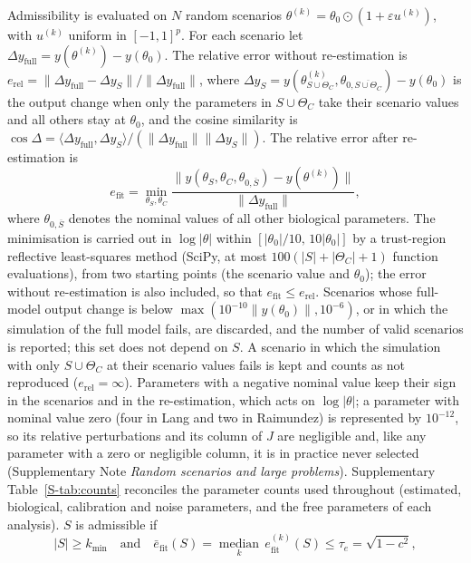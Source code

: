 \documentclass[pdflatex,sn-nature]{sn-jnl}
\theoremstyle{plain}
\begin{document}
Admissibility is evaluated on $N$ random scenarios $\theta^{(k)}=\theta_0\odot(1+\varepsilon u^{(k)})$, with $u^{(k)}$ uniform in $[-1,1]^p$. For each scenario let $\Delta y_{\mathrm{full}}=y(\theta^{(k)})-y(\theta_0)$. The relative error without re-estimation is $e_{\mathrm{rel}}=\|\Delta y_{\mathrm{full}}-\Delta y_S\|/\|\Delta y_{\mathrm{full}}\|$, where $\Delta y_S=y(\theta^{(k)}_{S\cup\Theta_C},\theta_{0,\overline{S\cup\Theta_C}})-y(\theta_0)$ is the output change when only the parameters in $S\cup\Theta_C$ take their scenario values and all others stay at $\theta_0$, and the cosine similarity is $\cos\Delta=\langle\Delta y_{\mathrm{full}},\Delta y_S\rangle/(\|\Delta y_{\mathrm{full}}\|\|\Delta y_S\|)$. The relative error after re-estimation is
\begin{equation}
e_{\mathrm{fit}}=\min_{\theta_{S},\theta_C}\frac{\|y(\theta_S,\theta_C,\theta_{0,\overline{S}})-y(\theta^{(k)})\|}{\|\Delta y_{\mathrm{full}}\|},
\label{eq:efit}
\end{equation}
where $\theta_{0,\overline{S}}$ denotes the nominal values of all other biological parameters. The minimisation is carried out in $\log|\theta|$ within $[|\theta_0|/10,\,10|\theta_0|]$ by a trust-region reflective least-squares method (SciPy\cite{bib33}, at most $100(|S|+|\Theta_C|+1)$ function evaluations), from two starting points (the scenario value and $\theta_0$); the error without re-estimation is also included, so that $e_{\mathrm{fit}}\le e_{\mathrm{rel}}$. Scenarios whose full-model output change is below $\max(10^{-10}\|y(\theta_0)\|,10^{-6})$, or in which the simulation of the full model fails, are discarded, and the number of valid scenarios is reported; this set does not depend on $S$. A scenario in which the simulation with only $S\cup\Theta_C$ at their scenario values fails is kept and counts as not reproduced ($e_{\mathrm{rel}}=\infty$). Parameters with a negative nominal value keep their sign in the scenarios and in the re-estimation, which acts on $\log|\theta|$; a parameter with nominal value zero (four in Lang and two in Raimundez) is represented by $10^{-12}$, so its relative perturbations and its column of $J$ are negligible and, like any parameter with a zero or negligible column, it is in practice never selected (Supplementary Note \textit{Random scenarios and large problems}). Supplementary Table~\ref{S-tab:counts} reconciles the parameter counts used throughout (estimated, biological, calibration and noise parameters, and the free parameters of each analysis). $S$ is admissible if
\begin{equation}
|S|\ge k_{\min}\quad\text{and}\quad \bar e_{\mathrm{fit}}(S)=\operatorname*{median}_{k}\,e^{(k)}_{\mathrm{fit}}(S)\le\tau_e=\sqrt{1-c^2},
\label{eq:adm}
\end{equation}
\end{document}
